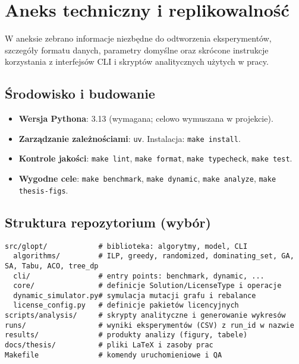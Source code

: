 \appendix

\chapter{Aneks techniczny i replikowalność}

W aneksie zebrano informacje niezbędne do odtworzenia eksperymentów, szczegóły formatu danych, parametry domyślne oraz skrócone instrukcje korzystania z interfejsów CLI i skryptów analitycznych użytych w pracy.

\section{Środowisko i budowanie}
\begin{itemize}
  \item \textbf{Wersja Pythona}: 3.13 (wymagana; celowo wymuszana w projekcie).
  \item \textbf{Zarządzanie zależnościami}: \texttt{uv}. Instalacja: \texttt{make install}.
  \item \textbf{Kontrole jakości}: \texttt{make lint}, \texttt{make format}, \texttt{make typecheck}, \texttt{make test}.
  \item \textbf{Wygodne cele}: \texttt{make benchmark}, \texttt{make dynamic}, \texttt{make analyze}, \texttt{make thesis-figs}.
\end{itemize}

\section{Struktura repozytorium (wybór)}
\begin{verbatim}
src/glopt/            # biblioteka: algorytmy, model, CLI
  algorithms/         # ILP, greedy, randomized, dominating_set, GA, SA, Tabu, ACO, tree_dp
  cli/                # entry points: benchmark, dynamic, ...
  core/               # definicje Solution/LicenseType i operacje
  dynamic_simulator.py# symulacja mutacji grafu i rebalance
  license_config.py   # definicje pakietów licencyjnych
scripts/analysis/     # skrypty analityczne i generowanie wykresów
runs/                 # wyniki eksperymentów (CSV) z run_id w nazwie
results/              # produkty analizy (figury, tabele)
docs/thesis/          # pliki LaTeX i zasoby prac
Makefile              # komendy uruchomieniowe i QA
\end{verbatim}

